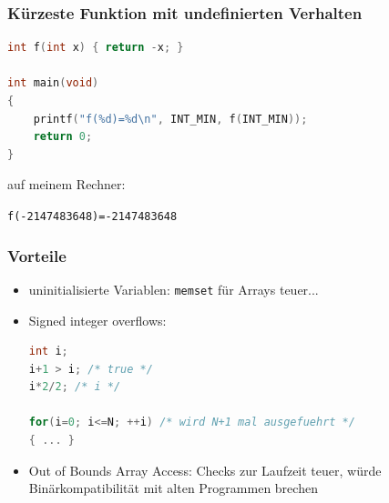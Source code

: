 \documentclass[12pt,compress]{beamer}
\begin{document}

\begin{frame}[fragile]
\frametitle{Kürzeste Funktion mit undefinierten Verhalten}

\begin{lstlisting}[language=C,basicstyle=\ttfamily\small,keywordstyle=\color{red}]
int f(int x) { return -x; }

int main(void)
{
    printf("f(%d)=%d\n", INT_MIN, f(INT_MIN));
    return 0;
}
\end{lstlisting}

\vfill

auf meinem Rechner:

\texttt{f(-2147483648)=-2147483648}

\end{frame}

\begin{frame}[fragile]
\frametitle{Vorteile}

\begin{itemize}
\item uninitialisierte Variablen: \texttt{memset} für Arrays teuer...
\item Signed integer overflows:
\begin{lstlisting}[language=C,basicstyle=\ttfamily\small,keywordstyle=\color{red}]
int i;
i+1 > i; /* true */ 
i*2/2; /* i */

for(i=0; i<=N; ++i) /* wird N+1 mal ausgefuehrt */
{ ... }
\end{lstlisting}
\item Out of Bounds Array Access: Checks zur Laufzeit teuer, würde Binärkompatibilität mit alten Programmen brechen
\end{itemize}
\end{frame}
\end{document}
